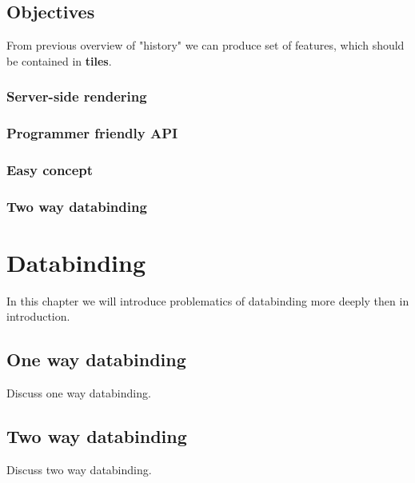 \documentclass[oneside, 12pt]{book}
\begin{document}
\section{Objectives}\label{sec:objectives}

From previous overview of "history" we can produce set of features, 
which should be contained in \textbf{tiles}.

\subsection{Server-side rendering}\label{subsec:objectives-server-side-rendering}
\subsection{Programmer friendly API}\label{subsec:objectives-friendly-api}
\subsection{Easy concept}\label{subsec:objectives-easy-concept}
\subsection{Two way databinding}\label{subsec:objectives-two-way-databinding}


\chapter{Databinding}\label{chap:databinding}

In this chapter we will introduce problematics of databinding more deeply then in introduction.

\section{One way databinding}\label{sec:onewaydatabinding}

Discuss one way databinding.

\section{Two way databinding}

Discuss two way databinding.

\end{document}
